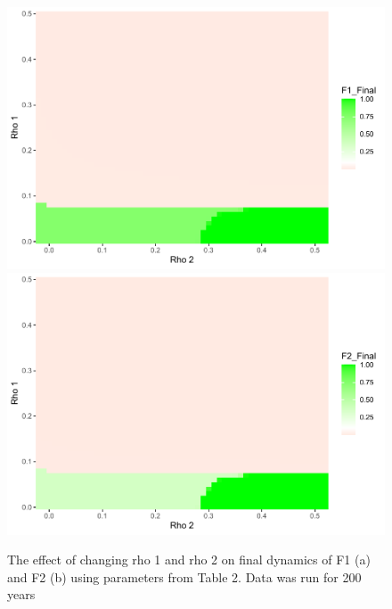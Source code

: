 \documentclass[
]{article}
\begin{document}
\begin{figure}
\includegraphics[width=0.5\linewidth]{Review1_NewFigsNotes_files/figure-latex/TwoGraphs-1} \includegraphics[width=0.5\linewidth]{Review1_NewFigsNotes_files/figure-latex/TwoGraphs-2} \caption{The effect of changing rho 1 and rho 2 on final dynamics of F1 (a) and F2 (b) using parameters from Table 2. Data was run for 200 years \label{TwoGraphs}}\label{fig:TwoGraphs}
\end{figure}
\end{document}

